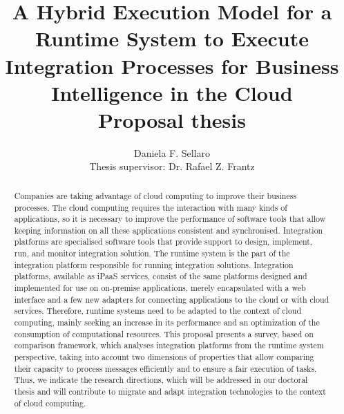 \documentclass[11pt]{article}
\title{A Hybrid Execution Model for a Runtime System to Execute Integration Processes for Business Intelligence in the Cloud \\ Proposal thesis}
\author{Daniela F. Sellaro \\ Thesis supervisor: Dr. Rafael Z. Frantz}
\begin{document}
\lstset{language=C++,basicstyle=\small,
        stringstyle=\ttfamily,showstringspaces=false}


\singlespace
\maketitle

\begin{abstract}                %
Companies are taking advantage of cloud computing to improve their business processes. The cloud computing requires the interaction with many kinds of applications, so it is necessary to improve the performance of software tools that allow keeping information on all these applications consistent and synchronised. Integration platforms are specialised software tools that provide support to design, implement, run, and monitor integration solution. The runtime system is the part of the integration platform responsible for running integration solutions.
Integration platforms, available as iPaaS services, consist of the same platforms designed and implemented for use on on-premise applications, merely encapsulated with a web interface and a few new adapters for connecting applications to the cloud or with cloud services. Therefore, runtime systems need to be adapted to the context of cloud computing, mainly seeking an increase in its performance and an optimization of the consumption of computational resources. 
This proposal presents a survey, based on comparison framework, which analyses integration platforms from the runtime system perspective, taking into account two dimensions of properties that allow comparing their capacity to process messages efficiently and to ensure a fair execution of tasks. Thus, we indicate the research directions, which will be addressed in our doctoral thesis and will contribute to migrate and adapt integration technologies to the context of cloud computing.
\end{abstract}
%
\setcounter{secnumdepth}{3}
%
\newpage
\doublespace
%

\doublespace

\doublespace
\end{document}
